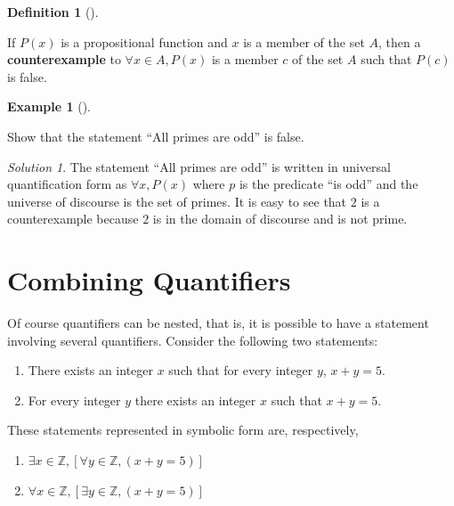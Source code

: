 \documentclass[
  letterpaper,
  10pt,
  reqno,
  twopage,
  openany]{book}
\providecommand{\tightlist}{%
  \setlength{\itemsep}{0pt}\setlength{\parskip}{0pt}}\usepackage{longtable,booktabs,array}
\theoremstyle{plain}
\theoremstyle{definition}
\theoremstyle{definition}
\newtheorem{definition}{Definition}[chapter]
\theoremstyle{definition}
\newtheorem{example}{Example}[chapter]
\theoremstyle{plain}
\theoremstyle{plain}
\theoremstyle{remark}
\newtheorem*{solution}{Solution}
\begin{document}
\leavevmode{}%
\begin{definition}[]\label{def-counterexample}

If \(P(x)\) is a propositional function and \(x\) is a member of the set
\(A\), then a  \textbf{counterexample} to
\(\forall x\in A, P(x)\) is a member \(c\) of the set \(A\) such that
\(P(c)\) is false.

\end{definition}

\leavevmode{}%
\begin{example}[]\label{exm-ce-1}

Show that the statement ``All primes are odd'' is false.

\end{example}

\begin{solution}

The statement ``All primes are odd'' is written in universal
quantification form as \(\forall x, P(x)\) where \(p\) is the predicate
``is odd'' and the universe of discourse is the set of primes. It is
easy to see that \(2\) is a counterexample because \(2\) is in the
domain of discourse and is not prime.

\end{solution}

\hypertarget{combining-quantifiers}{%
\section{Combining Quantifiers}\label{combining-quantifiers}}

Of course quantifiers can be nested, that is, it is possible to have a
statement involving several quantifiers. Consider the following two
statements:

\begin{enumerate}
\def\labelenumi{\arabic{enumi}.}
\tightlist
\item
  There exists an integer \(x\) such that for every integer \(y\),
  \(x+y=5\).
\item
  For every integer \(y\) there exists an integer \(x\) such that
  \(x+y=5\).
\end{enumerate}

These statements represented in symbolic form are, respectively,

\begin{enumerate}
\def\labelenumi{\arabic{enumi}.}
\tightlist
\item
  \(\exists x\in \mathbb{Z}, [ \forall y\in \mathbb{Z}, (x+y=5) ]\)
\item
  \(\forall x\in \mathbb{Z}, [ \exists y\in \mathbb{Z}, (x+y=5) ]\)
\end{enumerate}
\end{document}
